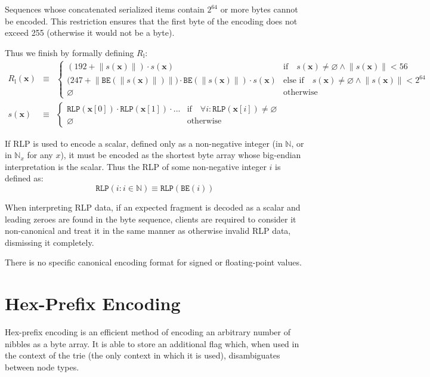 \documentclass[9pt,oneside]{amsart}
\begin{document}
Sequences whose concatenated serialized items contain $2^{64}$ or more bytes cannot be encoded. This restriction ensures that the first byte of the encoding does not exceed 255 (otherwise it would not be a byte).

\hypertarget{RLP_serialisation_of_a_sequence_of_other_items_R__l_math_def}{}Thus we finish by formally defining $R_{\mathrm{l}}$:
\begin{eqnarray}
R_{\mathrm{l}}(\mathbf{x}) & \equiv & \begin{cases}
(192 + \lVert s(\mathbf{x}) \rVert) \cdot s(\mathbf{x}) & \text{if} \quad s(\mathbf{x}) \neq \varnothing \wedge \lVert s(\mathbf{x}) \rVert < 56 \\
\big(247 + \big\lVert \mathtt{BE}(\lVert s(\mathbf{x}) \rVert) \big\rVert \big) \cdot \mathtt{BE}(\lVert s(\mathbf{x}) \rVert) \cdot s(\mathbf{x}) & \text{else if} \quad s(\mathbf{x}) \neq \varnothing \wedge \lVert s(\mathbf{x}) \rVert < 2^{64} \\
\varnothing & \text{otherwise}
\end{cases} \\
s(\mathbf{x}) & \equiv & \begin{cases}
\mathtt{RLP}(\mathbf{x}[0]) \cdot \mathtt{RLP}(\mathbf{x}[1]) \cdot ... & \text{if} \quad \forall i: \mathtt{RLP}(\mathbf{x}[i]) \neq \varnothing \\
\varnothing & \text{otherwise}
\end{cases}
\end{eqnarray}

If RLP is used to encode a scalar, defined only as a non-negative integer (in $\mathbb{N}$, or in $\mathbb{N}_x$ for any $x$), it must be encoded as the shortest byte array whose big-endian interpretation is the scalar. Thus the RLP of some non-negative integer $i$ is defined as:
\begin{equation}
\mathtt{RLP}(i : i \in \mathbb{N}) \equiv \mathtt{RLP}(\mathtt{BE}(i))
\end{equation}

When interpreting RLP data, if an expected fragment is decoded as a scalar and leading zeroes are found in the byte sequence, clients are required to consider it non-canonical and treat it in the same manner as otherwise invalid RLP data, dismissing it completely.

There is no specific canonical encoding format for signed or floating-point values.

\section{Hex-Prefix Encoding}\label{app:hexprefix}
Hex-prefix encoding is an efficient method of encoding an arbitrary number of nibbles as a byte array. It is able to store an additional flag which, when used in the context of the trie (the only context in which it is used), disambiguates between node types.
\end{document}
